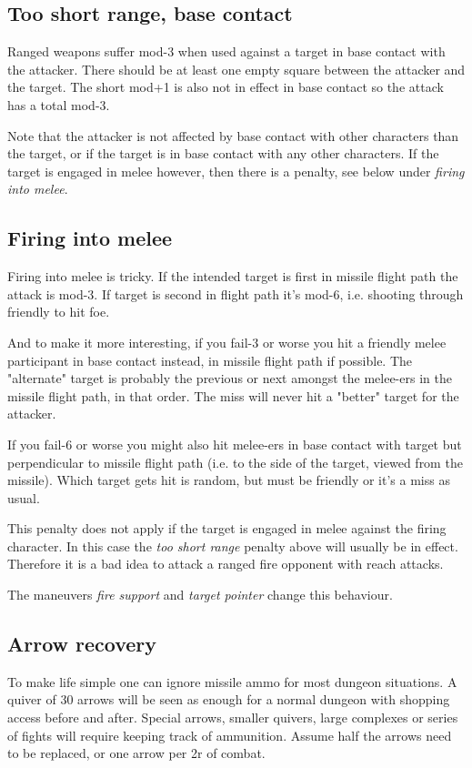 \subsection*{Too short range, base contact}
Ranged weapons suffer mod-3 when used against a target in base contact with the attacker. There should be at least one empty square between the attacker and the target. The short mod+1 is also not in effect in base contact so the attack has a total mod-3.

Note that the attacker is not affected by base contact with other characters than the target, or if the target is in base contact with any other characters. If the target is engaged in melee however, then there is a penalty, see below under \emph{firing into melee}.


\subsection*{Firing into melee}
Firing into melee is tricky. If the intended target is first in missile flight path the attack is mod-3. If target is second in flight path it's mod-6, i.e. shooting through friendly to hit foe.

And to make it more interesting, if you fail-3 or worse you hit a friendly melee participant in base contact instead, in missile flight path if possible. The "alternate" target is probably the previous or next amongst the melee-ers in the missile flight path, in that order. The miss will never hit a "better" target for the attacker.

If you fail-6 or worse you might also hit melee-ers in base contact with target but perpendicular to missile flight path (i.e. to the side of the target, viewed from the missile). Which target gets hit is random, but must be friendly or it's a miss as usual.

This penalty does not apply if the target is engaged in melee against the firing character. In this case the \emph{too short range} penalty above will usually be in effect. Therefore it is a bad idea to attack a ranged fire opponent with reach attacks.

The maneuvers \emph{fire support} and \emph{target pointer} change this behaviour.


\subsection*{Arrow recovery}
To make life simple one can ignore missile ammo for most dungeon situations. A quiver of 30 arrows will be seen as enough for a normal dungeon with shopping access before and after. Special arrows, smaller quivers, large complexes or series of fights will require keeping track of ammunition. Assume half the arrows need to be replaced, or one arrow per 2r of combat.

